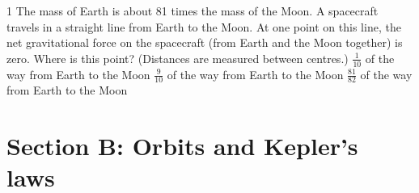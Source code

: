 \begin{practiceq}{1}{}
The mass of Earth is about 81 times the mass of the Moon. A spacecraft travels in a straight line
from Earth to the Moon. At one point on this line, the net gravitational force on the spacecraft
(from Earth and the Moon together) is zero. Where is this point? (Distances are measured between
centres.)
  {$\frac{1}{10}$ of the way from Earth to the Moon}
  {$\frac{9}{10}$ of the way from Earth to the Moon}
  {$\frac{81}{82}$ of the way from Earth to the Moon}
\end{practiceq}

\section*{Section B: Orbits and Kepler's laws}

